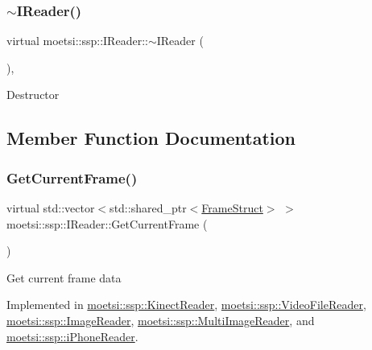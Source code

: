 \subsubsection{\texorpdfstring{$\sim$\+I\+Reader()}{~IReader()}}
{\footnotesize\ttfamily virtual moetsi\+::ssp\+::\+I\+Reader\+::$\sim$\+I\+Reader (\begin{DoxyParamCaption}{ }\end{DoxyParamCaption})\hspace{0.3cm}{\ttfamily [inline]}, {\ttfamily [virtual]}}

Destructor 

\subsection{Member Function Documentation}
\mbox{\label{classmoetsi_1_1ssp_1_1IReader_a357439182128e3911d77335c136035c0}} 
\subsubsection{\texorpdfstring{Get\+Current\+Frame()}{GetCurrentFrame()}}
{\footnotesize\ttfamily virtual std\+::vector$<$std\+::shared\+\_\+ptr$<$\hyperlink{structmoetsi_1_1ssp_1_1FrameStruct}{Frame\+Struct}$>$ $>$ moetsi\+::ssp\+::\+I\+Reader\+::\+Get\+Current\+Frame (\begin{DoxyParamCaption}{ }\end{DoxyParamCaption})\hspace{0.3cm}{\ttfamily [pure virtual]}}

Get current frame data 

Implemented in \hyperlink{classmoetsi_1_1ssp_1_1KinectReader_a7f0d8f5d643ebeff0589eeb8af5b9a9e}{moetsi\+::ssp\+::\+Kinect\+Reader}, \hyperlink{classmoetsi_1_1ssp_1_1VideoFileReader_a1c4adbf0de8d00d52b36fade1f30baa4}{moetsi\+::ssp\+::\+Video\+File\+Reader}, \hyperlink{classmoetsi_1_1ssp_1_1ImageReader_aacdb29f83bf5e38231ef26d89338c3b1}{moetsi\+::ssp\+::\+Image\+Reader}, \hyperlink{classmoetsi_1_1ssp_1_1MultiImageReader_a6a0aceb3412f25580876a4fbcedf7ed0}{moetsi\+::ssp\+::\+Multi\+Image\+Reader}, and \hyperlink{classmoetsi_1_1ssp_1_1iPhoneReader_ad3b35cece8ba5b53edb110b5c1aa80bc}{moetsi\+::ssp\+::i\+Phone\+Reader}.

